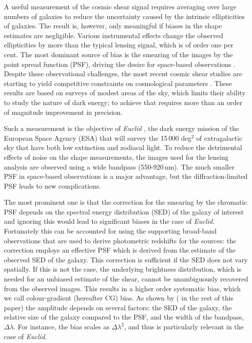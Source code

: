 \documentclass[useAMS,usenatbib]{mnras}
\begin{document}
A useful measurement of the cosmic shear signal requires averaging over large numbers of galaxies
to reduce the uncertainty caused by the intrinsic ellipticities of galaxies. The result is, however, only meaningful if biases in the shape estimates are negligible. Various instrumental effects change the observed ellipticities by more than the typical lensing signal, which is of order one per cent. The most dominant source of bias is the smearing of the images by the point spread function (PSF), driving the desire for space-based observations \citep{Paulin-Henriksson08, Massey13}.
Despite these observational challenges, the most recent cosmic shear studies are starting to yield competitive constraints on cosmological parameters \citep{Heymans13, Jarvis16,Jee16,Hildebrandt17}. These results are based on surveys of modest areas of the sky, which limits their ability to study the nature of dark energy; to achieve that requires more than an order of magnitude improvement in precision.

Such a measurement is the objective of {\it Euclid} \citep{Laureijs11}, the dark energy mission of the European Space Agency (ESA) that will survey the 15\,000 deg$^2$ of extragalactic sky that have both low extinction and zodiacal light. To reduce the detrimental effects of noise on the shape measurements, the images used for the lensing analysis are observed using a wide bandpass (550-920\,nm). The much smaller PSF in space-based observations 
is a major advantage, but the diffraction-limited PSF leads to new complications. 

The most prominent one is that the correction for the smearing by the chromatic PSF depends on the spectral energy distribution (SED) of the galaxy of interest \citep{Cypriano10, Eriksen17} and ignoring this would lead to significant biases in the case of {\it Euclid}. Fortunately this can be accounted for using the supporting broad-band observations that are used to derive photometric redshifts for the sources: the correction employs an effective PSF which is derived from the estimate of the observed SED of the galaxy. This correction is sufficient if the SED does not vary spatially. If this is not the case, the underlying brightness distribution, which is needed for an unbiased estimate of the shear, cannot be unambiguously recovered from the observed images.
This results in a higher order systematic bias, which we call colour-gradient (hereafter CG) bias.
As shown by \cite{Semboloni13} ( in the rest of this paper) the amplitude depends on several factors: the SED of the galaxy, the relative size of the galaxy compared to the PSF, and the width of the bandpass, $\Delta\lambda$.  For instance, the bias scales as $\Delta\lambda^2$, and thus is particularly relevant in the case of {\it Euclid}.
\end{document}
